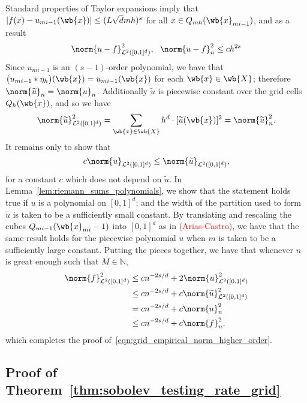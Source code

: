 \documentclass{article}
\newcommand{\abs}[1]{\left \lvert #1 \right \rvert}
\newcommand{\1}{\mathbf{1}}
\newcommand{\Leb}{\mathcal{L}}
\newcommand{\wt}[1]{\widetilde{#1}}
\theoremstyle{alden}
\theoremstyle{aldenthm}
\theoremstyle{definition}
\theoremstyle{remark}
\begin{document}
Standard properties of Taylor expansions imply that $\abs{f(x) - u_{mi - 1}(\wb{x})} \leq (L\sqrt{d}mh)^{s}$ for all $x \in Q_{mh}(\wb{x}_{mi - 1})$, and as a result
\begin{equation*}
\norm{u - f}_{\Leb^2([0,1]^d)}^2,~~\norm{u - f}_{n}^2 \leq ch^{2s}
\end{equation*}
Since $u_{mi- 1}$ is an $(s - 1)$-order polynomial, we have that $\bigl(u_{mi - 1} \ast \eta_h\bigr)(\wb{x}) = u_{mi - 1}(\wb{x})$ for each $\wb{x} \in \wb{X}$; therefore $\norm{\wt{u}}_n = \norm{u}_n$.
Additionally $\wt{u}$ is piecewise constant over the grid cells $Q_h(\wb{x})$, and so we have
\begin{equation*}
\norm{\wt{u}}_{\Leb^2([0,1]^d)}^2 = \sum_{\wb{x} \in \wb{X}} h^d \cdot  [\wt{u}(\wb{x})]^2 = \norm{\wt{u}}_n^2.
\end{equation*}
It remains only to show that
\begin{equation*}
c \norm{u}_{\Leb^2([0,1]^d)} \leq \norm{\wt{u}}_{\Leb^2([0,1]^d)},
\end{equation*}
for a constant $c$ which does not depend on $\wt{u}$. In Lemma~\ref{lem:riemann_sums_polynomials}, we show that the statement holds true if $u$ is a polynomial on $[0,1]^d$; and the width of the partition used to form $\wt{u}$ is taken to be a sufficiently small constant. By translating and rescaling the cubes $Q_{mi - 1}(\wb{x}_{mi} - 1)$ into $[0,1]^d$ as in \textcolor{red}{(Arias-Castro)}, we have that the same result holds for the piecewise polynomial $u$ when $m$ is taken to be a sufficiently large constant. Putting the pieces together, we have that whenever $n$ is great enough such that $M \in \mathbb{N}$, 
\begin{align*}
\norm{f}_{\Leb^2([0,1]^d)}^2 & \leq cn^{-2s/d} + 2\norm{u}_{\Leb^2([0,1]^d)}^2 \\ & \leq cn^{-2s/d} + c\norm{\wt{u}}_{\Leb^2([0,1]^d)}^2 \\
& = cn^{-2s/d} + c\norm{u}_{n}^2 \\
& \leq cn^{-2s/d} + c\norm{f}_n^2.
\end{align*}
which completes the proof of~\eqref{eqn:grid_empirical_norm_higher_order}.

\subsection{Proof of Theorem~\ref{thm:sobolev_testing_rate_grid}}
\end{document}
